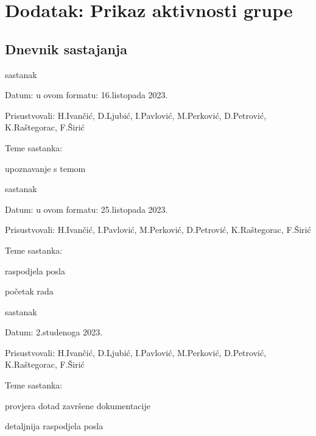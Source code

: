 \chapter*{Dodatak: Prikaz aktivnosti grupe}
		
		\section*{Dnevnik sastajanja}

		\begin{packed_enum}
			\item  sastanak
			
			\item[] \begin{packed_item}
				\item Datum: u ovom formatu: 16.listopada 2023.
				\item Prisustvovali: H.Ivančić, D.Ljubić, I.Pavlović, M.Perković, D.Petrović, K.Raštegorac, F.Širić
				\item Teme sastanka:
				\begin{packed_item}
					\item  upoznavanje s temom
				\end{packed_item}
			\end{packed_item}
			
			\item  sastanak
			\item[] \begin{packed_item}
				\item Datum: u ovom formatu: 25.listopada 2023.
				\item Prisustvovali: H.Ivančić, I.Pavlović, M.Perković, D.Petrović, K.Raštegorac, F.Širić
				\item Teme sastanka:
				\begin{packed_item}
					\item  raspodjela posla
					\item  početak rada
				\end{packed_item}
			\end{packed_item}
			
			\item  sastanak
			\item[] \begin{packed_item}
				\item Datum: 2.studenoga 2023.
				\item Prisustvovali: H.Ivančić, D.Ljubić, I.Pavlović, M.Perković, D.Petrović, K.Raštegorac, F.Širić
				\item Teme sastanka:
				\begin{packed_item}
					\item  provjera dotad završene dokumentacije
					\item detaljnija raspodjela posla
				\end{packed_item}
			\end{packed_item}
			

\end{packed_enum}

